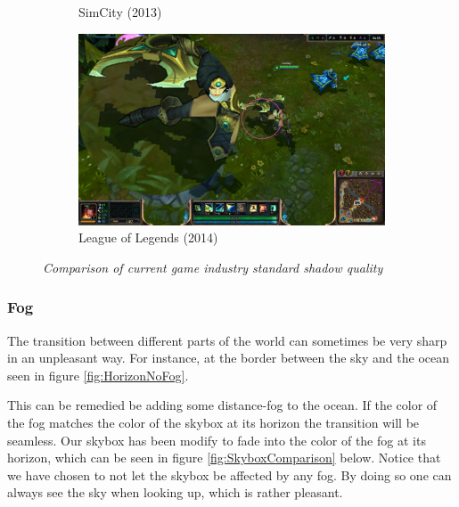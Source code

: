 \begin{figure}[H]
\begin{subfigure}{.5\textwidth}
  \caption{SimCity (2013)}
  \label{fig:SMExSimCity}
\end{subfigure}%
\begin{subfigure}{.5\textwidth}
  \centering
  \includegraphics[width=0.9\linewidth]{images/SMExLoL.png}
  \caption{League of Legends (2014)}
  \label{fig:SMExLoL}
\end{subfigure}
\caption[Game industry standard shadow quality comparison]{\textit{Comparison of current game industry standard shadow quality}}
\label{fig:SMExComparison}
\end{figure}

\subsubsection{Fog}
The transition between different parts of the world can sometimes be very sharp in an unpleasant way. For instance, at the border between the sky and the ocean seen in figure \ref{fig:HorizonNoFog}. 

This can be remedied be adding some distance-fog to the ocean. If the color of the fog matches the color of the skybox at its horizon the transition will be seamless. Our skybox has been modify to fade into the color of the fog at its horizon, which can be seen in figure \ref{fig:SkyboxComparison} below. Notice that we have chosen to not let the skybox be affected by any fog. By doing so one can always see the sky when looking up, which is rather pleasant. 

